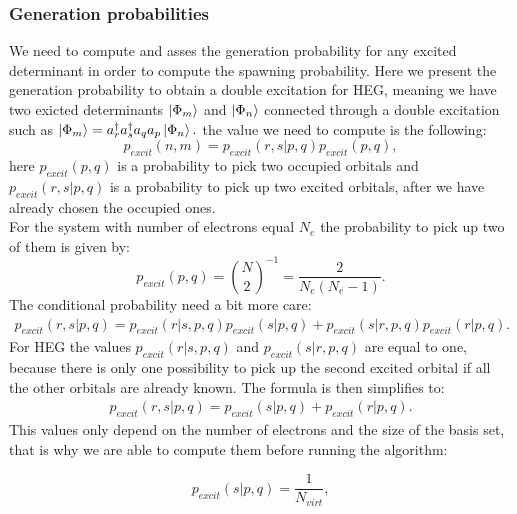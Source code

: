 \documentclass[twoside,english]{uiofysmaster}
\theoremstyle{definition}
\begin{document}
\subsubsection{Generation probabilities}
We need to compute and asses the generation probability for any excited determinant in order to compute the spawning probability. Here we present the generation probability to obtain a double excitation for HEG, meaning we have two exicted determinants $\ket{\Phi_{m}}$ and $\ket{\Phi_n}$ connected through a double excitation such as $ \ket{\Phi_{m}}=a^\dagger_r a^\dagger_s a_q a_p \ket{\Phi_n}.$ 
the value we need to compute is the following:
\begin{equation}
p_{excit}(n,m) = p_{excit}(r,s|p,q)p_{excit}(p,q),
\end{equation}
here $p_{excit}(p,q)$ is a probability to pick two occupied orbitals and $p_{excit}(r,s|p,q)$ is a probability to pick up two excited orbitals, after we have already chosen the occupied ones. \\
For the system with number of electrons equal $N_e$ the probability to pick up two of them is given by:
\begin{equation}
p_{excit}(p,q)= \binom{N}{2}^{-1}= \frac{2}{N_e(N_e-1)}.
\end{equation}
The conditional probability need a bit more care:
\begin{align}
p_{excit}(r,s|p,q) = p_{excit}(r|s,p,q)p_{excit}(s|p,q) + p_{excit}(s|r,p,q)p_{excit}(r|p,q).
\end{align}
For HEG the values $p_{excit}(r|s,p,q)$ and $p_{excit}(s|r,p,q)$ are equal to one, because there is only one possibility to pick up the second excited orbital if all the other orbitals are already known. The formula is then simplifies to:
\begin{align}
p_{excit}(r,s|p,q) = p_{excit}(s|p,q) + p_{excit}(r|p,q).
\end{align}
This values only depend on the number of electrons and the size of the basis set, that is why we are able to compute them before running the algorithm:

\begin{equation}
p_{excit}(s|p,q) = \frac{1}{N_{virt}},
\end{equation}
\end{document}
